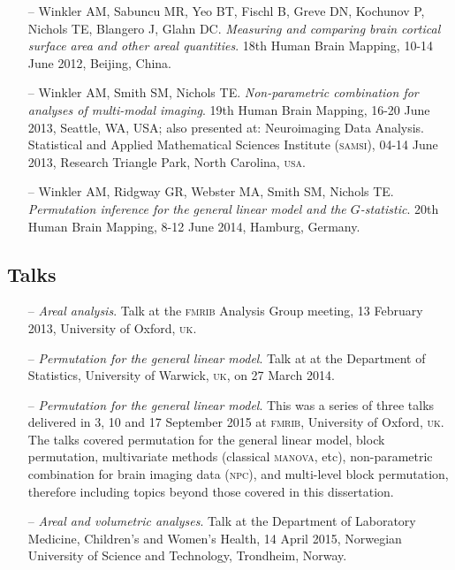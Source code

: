 \begin{itemize}
\item[--] Winkler AM, Sabuncu MR, Yeo BT, Fischl B, Greve DN, Kochunov P, Nichols TE, Blangero J, Glahn DC. \emph{Measuring and comparing brain cortical surface area and other areal quantities}. 18th Human Brain Mapping, 10-14 June 2012, Beijing, China.
\item[--] Winkler AM, Smith SM, Nichols TE. \emph{Non-parametric combination for analyses of multi-modal imaging}. 19th Human Brain Mapping, 16-20 June 2013, Seattle, WA, USA; also presented at: Neuroimaging Data Analysis. Statistical and Applied Mathematical Sciences Institute (\textsc{samsi}), 04-14 June 2013, Research Triangle Park, North Carolina, \textsc{usa}.
\item[--] Winkler AM, Ridgway GR, Webster MA, Smith SM, Nichols TE. \emph{Permutation inference for the general linear model and the $G$-statistic}. 20th Human Brain Mapping, 8-12 June 2014, Hamburg, Germany.
\end{itemize}

\subsection{Talks}

\begin{itemize}
\item[--] \emph{Areal analysis}. Talk at the \textsc{fmrib} Analysis Group meeting, 13 February 2013, University of Oxford, \textsc{uk}.
\item[--] \emph{Permutation for the general linear model}. Talk at at the Department of Statistics, University of Warwick, \textsc{uk}, on 27 March 2014.
\item[--] \emph{Permutation for the general linear model}. This was a series of three talks delivered in 3, 10 and 17 September 2015 at \textsc{fmrib}, University of Oxford, \textsc{uk}. The talks covered permutation for the general linear model, block permutation, multivariate methods (classical \textsc{manova}, etc), non-parametric combination for brain imaging data (\textsc{npc}), and multi-level block permutation, therefore including topics beyond those covered in this dissertation.
\item[--] \emph{Areal and volumetric analyses}. Talk at the Department of Laboratory Medicine, Children’s and Women’s Health, 14 April 2015, Norwegian University of Science and Technology, Trondheim, Norway.

\end{itemize}

